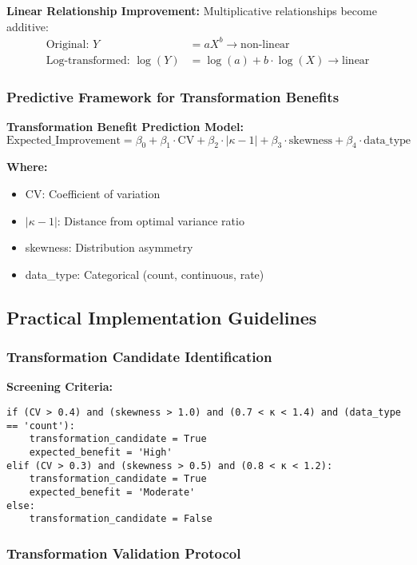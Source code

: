 \textbf{Linear Relationship Improvement:} Multiplicative relationships become additive:
\begin{align}
\text{Original: } Y &= aX^b \rightarrow \text{non-linear} \\
\text{Log-transformed: } \log(Y) &= \log(a) + b \cdot \log(X) \rightarrow \text{linear}
\end{align}

\subsubsection{Predictive Framework for Transformation Benefits}

\textbf{Transformation Benefit Prediction Model:}
\begin{equation}
\text{Expected\_Improvement} = \beta_0 + \beta_1 \cdot \text{CV} + \beta_2 \cdot |\kappa - 1| + \beta_3 \cdot \text{skewness} + \beta_4 \cdot \text{data\_type}
\end{equation}

\textbf{Where:}
\begin{itemize}
    \item CV: Coefficient of variation
    \item $|\kappa - 1|$: Distance from optimal variance ratio
    \item skewness: Distribution asymmetry
    \item data\_type: Categorical (count, continuous, rate)
\end{itemize}

\subsection{Practical Implementation Guidelines}

\subsubsection{Transformation Candidate Identification}

\textbf{Screening Criteria:}
\begin{verbatim}
if (CV > 0.4) and (skewness > 1.0) and (0.7 < κ < 1.4) and (data_type == 'count'):
    transformation_candidate = True
    expected_benefit = 'High'
elif (CV > 0.3) and (skewness > 0.5) and (0.8 < κ < 1.2):
    transformation_candidate = True  
    expected_benefit = 'Moderate'
else:
    transformation_candidate = False
\end{verbatim}

\subsubsection{Transformation Validation Protocol}

